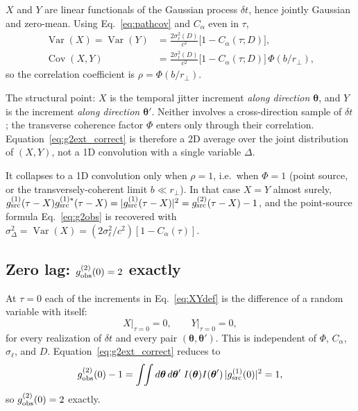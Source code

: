 \documentclass[aps,prd,onecolumn,amsmath,amssymb]{revtex4-2}
\begin{document}
$X$ and $Y$ are linear functionals of the Gaussian process $\delta t$,
hence jointly Gaussian and zero-mean.  Using
Eq.~\eqref{eq:pathcov} and $C_\alpha$ even in $\tau$,
\begin{align}
  \operatorname{Var}(X) = \operatorname{Var}(Y)
    &= \frac{2\sigma_\ell^2(D)}{c^2}\big[1 - C_\alpha(\tau;D)\big],
    \label{eq:varX}\\
  \operatorname{Cov}(X,Y)
    &= \frac{2\sigma_\ell^2(D)}{c^2}\big[1 - C_\alpha(\tau;D)\big]\,
       \Phi\!\left(b/r_\perp\right),
    \label{eq:covXY}
\end{align}
so the correlation coefficient is $\rho = \Phi(b/r_\perp)$.

The structural point: $X$ is the temporal jitter increment
\emph{along direction $\boldsymbol{\theta}$}, and $Y$ is the increment
\emph{along direction $\boldsymbol{\theta}'$}.  Neither involves a
cross-direction sample of $\delta t$; the transverse coherence factor
$\Phi$ enters only through their correlation.  Equation~\eqref{eq:g2ext_correct}
is therefore a 2D average over the joint distribution of $(X,Y)$, not a
1D convolution with a single variable $\Delta$.

It collapses to a 1D convolution only when $\rho = 1$, i.e.\ when
$\Phi = 1$ (point source, or the transversely-coherent limit
$b\ll r_\perp$).  In that case $X = Y$ almost surely,
$g^{(1)}_{\rm src}(\tau-X)g^{(1)*}_{\rm src}(\tau-X) =
|g^{(1)}_{\rm src}(\tau-X)|^2 = g^{(2)}_{\rm src}(\tau-X)-1$, and the
point-source formula Eq.~\eqref{eq:g2obs} is recovered with
$\sigma_\Delta^2 = \operatorname{Var}(X) =
(2\sigma_\ell^2/c^2)[1-C_\alpha(\tau)]$.

\subsection{Zero lag: $g^{(2)}_{\rm obs}(0) = 2$ exactly}

At $\tau=0$ each of the increments in Eq.~\eqref{eq:XYdef} is the
difference of a random variable with itself:
\begin{equation}
  X\big|_{\tau=0} = 0,\qquad Y\big|_{\tau=0} = 0,
\end{equation}
for every realization of $\delta t$ and every pair
$(\boldsymbol{\theta},\boldsymbol{\theta}')$.  This is independent of
$\Phi$, $C_\alpha$, $\sigma_\ell$, and $D$.  Equation~\eqref{eq:g2ext_correct} reduces to
\begin{equation}
  g^{(2)}_{\rm obs}(0) - 1
  = \int\!\!\int d\boldsymbol{\theta}\,d\boldsymbol{\theta}'\;
    I(\boldsymbol{\theta})I(\boldsymbol{\theta}')\,
    |g^{(1)}_{\rm src}(0)|^2 = 1,
\end{equation}
so $g^{(2)}_{\rm obs}(0) = 2$ exactly.
\end{document}
